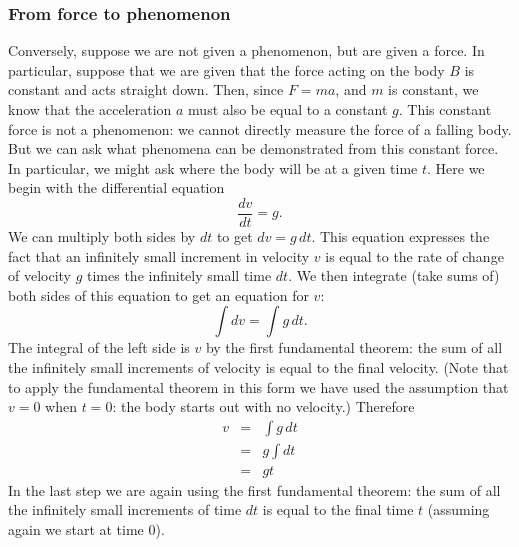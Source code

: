 \documentclass[twoside,openright]{article}
\begin{document}
\subsubsection*{From force to phenomenon}
Conversely, suppose we are not given a phenomenon, but are given a
force.  In particular, suppose that we are given that the force acting
on the body $B$ is constant and acts straight down.  Then, since
$F= ma$, and $m$ is constant, we know that the acceleration $a$ must
also be equal to a constant $g$.  This constant force is not a
phenomenon: we cannot directly measure the force of a falling body.
But we can ask what phenomena can be demonstrated from this constant
force.  In particular, we might ask where the body will be at a given
time $t$.  Here we begin with the differential equation
$$\frac{dv}{dt} = g.$$
We can multiply both sides by $dt$ to get $dv = g\,dt$.  This equation expresses the fact that an infinitely small increment in velocity $v$ is equal to the rate of change of velocity $g$ times the infinitely small time $dt$.
We then integrate (take sums of) both sides of this equation to get an
equation for $v$:
$$\int dv = \int \!g \,dt.$$
The integral of the left side is $v$
by the first fundamental theorem: the sum of all the infinitely small increments of velocity is equal to the final velocity.  (Note that to apply the fundamental
theorem in this form we have used the assumption that $v=0$ when
$t=0$: the body starts out with no velocity.)  Therefore
\begin{eqnarray*}
  v & = & \int \!g\,dt\\
    & = & g\int\!dt\\
    & = & gt 
\end{eqnarray*}
In the last step we are again using the first fundamental theorem: the sum of all the infinitely small increments of time $dt$ is equal to the final time $t$ (assuming again we start at time 0).
\end{document}
